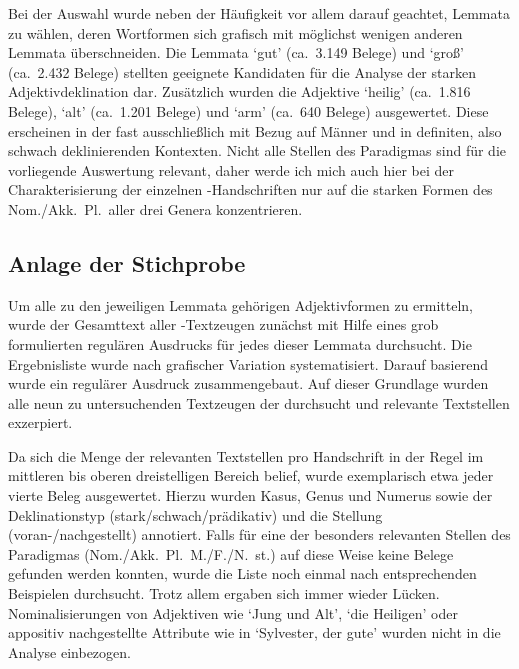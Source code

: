Bei der Auswahl wurde neben der Häufigkeit vor allem darauf geachtet, Lemmata
zu wählen, deren Wortformen sich grafisch mit möglichst wenigen anderen
Lemmata überschneiden. Die Lemmata
`gut' (ca.~3.149 Belege) und
 `groß' (ca.~2.432 Belege) stellten geeignete Kandidaten für
die Analyse der starken Adjektivdeklination dar. Zusätzlich wurden die
Adjektive
 `heilig' (ca.~1.816 Belege),  `alt'
(ca.~1.201 Belege) und  `arm' (ca.~640 Belege) ausgewertet.
Diese erscheinen in der \KC{} fast ausschließlich mit Bezug auf Männer und
in definiten, also schwach deklinierenden Kontexten. Nicht alle Stellen des
Paradigmas sind für die vorliegende Auswertung relevant, daher werde ich mich
auch hier bei der Charakterisierung der einzelnen \KC{}-Handschriften nur
auf die starken Formen des Nom./Akk.\ Pl.\ aller drei Genera konzentrieren.

\subsection{Anlage der Stichprobe}

Um alle zu den jeweiligen Lemmata gehörigen Adjektivformen zu ermitteln, wurde
der Gesamttext aller \KC{}-Textzeugen zunächst mit Hilfe eines grob
formulierten regulären Ausdrucks für jedes dieser Lemmata durchsucht.
Die Ergebnisliste wurde nach grafischer Variation systematisiert. Darauf
basierend wurde ein regulärer Ausdruck zusammengebaut.
Auf dieser Grundlage wurden alle neun zu untersuchenden Textzeugen der
\KC{} durchsucht und relevante Textstellen exzerpiert.

Da sich die Menge der relevanten Textstellen pro Handschrift in der Regel im
mittleren bis oberen dreistelligen Bereich belief, wurde exemplarisch etwa
jeder vierte Beleg ausgewertet. Hierzu wurden
Kasus, Genus und Numerus
sowie der Deklinationstyp (stark/schwach/prädikativ) und die Stellung
(voran-/nachgestellt) annotiert. Falls für eine der besonders relevanten
Stellen des Paradigmas (Nom./Akk.\ Pl.\ M./F./N.\ st.) auf diese Weise keine
Belege gefunden werden konnten, wurde die Liste noch einmal nach entsprechenden
Beispielen durchsucht. Trotz allem ergaben sich immer wieder Lücken.
Nominalisierungen von Adjektiven wie  `Jung und Alt',
`die Heiligen' oder appositiv nachgestellte Attribute wie in
 `Sylvester, der gute' wurden nicht in die
Analyse einbezogen.

